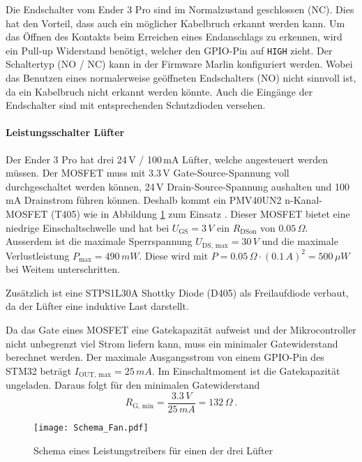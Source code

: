 Die Endschalter vom Ender 3 Pro sind im Normalzustand geschlossen (NC). Dies hat den Vorteil, dass auch ein möglicher Kabelbruch erkannt werden kann. Um das Öffnen des Kontakts beim Erreichen eines Endanschlags zu erkennen, wird ein Pull-up Widerstand benötigt, welcher den GPIO-Pin auf \texttt{HIGH} zieht.
Der Schaltertyp (NO / NC) kann in der Firmware Marlin konfiguriert werden. Wobei das Benutzen eines normalerweise geöffneten Endschalters (NO) nicht sinnvoll ist, da ein Kabelbruch nicht erkannt werden könnte.
Auch die Eingänge der Endschalter sind mit entsprechenden Schutzdioden versehen.\\

\paragraph{Leistungsschalter Lüfter}
Der Ender 3 Pro hat drei 24\,V / 100\,mA Lüfter, welche angesteuert werden müssen. 
Der MOSFET muss mit 3.3\,V Gate-Source-Spannung voll durchgeschaltet werden können, 24\,V Drain-Source-Spannung aushalten und 100\,mA Drainstrom führen können.
Deshalb kommt ein PMV40UN2 n-Kanal-MOSFET (T405) wie in Abbildung \ref{pic:Schema_Fan} zum Einsatz \cite{PMV40UN2}.
Dieser MOSFET bietet eine niedrige Einschaltschwelle und hat bei $U_{\text{GS}}=3\,\si{V}$ ein  $R_{\text{DSon}}$ von $0.05\,\si{\Omega}$.
Ausserdem ist die maximale Sperrspannung $U_{\text{DS, max}}=30\,\si{V}$ und die maximale Verlustleistung  $P_{\text{max}}=490\,\si{mW}$.
Diese wird mit  $P=0.05\,\si{\Omega}\cdot(0.1 \,\si{A})^2 = 500\,\si{\mu W}$ bei Weitem unterschritten.

Zusätzlich ist eine STPS1L30A Shottky Diode (D405) als Freilaufdiode verbaut, da der Lüfter eine induktive Last darstellt.

Da das Gate eines MOSFET eine Gatekapazität aufweist und der Mikrocontroller nicht unbegrenzt viel Strom liefern kann, muss ein minimaler Gatewiderstand berechnet werden.
Der maximale Ausgangsstrom von einem GPIO-Pin des STM32 beträgt $I_{\text{OUT, max}} = 25\,\si{mA}$.
Im Einschaltmoment ist die Gatekapazität ungeladen. Daraus folgt für den minimalen Gatewiderstand
\[
R_{\text{G, min}}=\frac{3.3\,\si{V}}{25\,\si{mA}}=132\,\si{\Omega}\ .
\]
\begin{figure}[H]
	\centering
	\texttt{[image: Schema\_Fan.pdf]}
	\caption{Schema eines Leistungstreibers für einen der drei Lüfter}
	\label{pic:Schema_Fan}
\end{figure}

